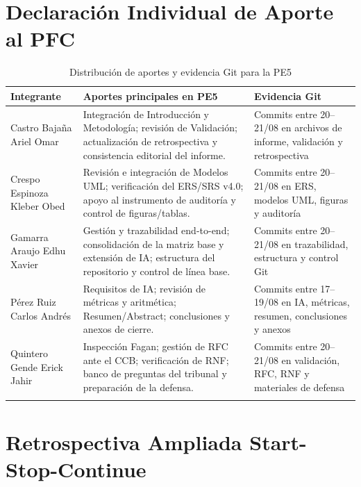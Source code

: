 \documentclass[11pt,a4paper]{article}
\begin{document}
\section{Declaración Individual de Aporte al PFC}
\label{anx:aporte}

\begin{longtable}{|p{3.7cm}|p{7cm}|p{3.2cm}|}
\hline
\textbf{Integrante} & \textbf{Aportes principales en PE5} & \textbf{Evidencia Git} \\
\hline
Castro Bajaña Ariel Omar &
Integración de Introducción y Metodología; revisión de Validación; actualización de retrospectiva y consistencia editorial del informe. &
Commits entre 20--21/08 en archivos de informe, validación y retrospectiva \\
\hline
Crespo Espinoza Kleber Obed &
Revisión e integración de Modelos UML; verificación del ERS/SRS v4.0; apoyo al instrumento de auditoría y control de figuras/tablas. &
Commits entre 20--21/08 en ERS, modelos UML, figuras y auditoría \\
\hline
Gamarra Araujo Edhu Xavier &
Gestión y trazabilidad end-to-end; consolidación de la matriz base y extensión de IA; estructura del repositorio y control de línea base. &
Commits entre 20--21/08 en trazabilidad, estructura y control Git \\
\hline
Pérez Ruiz Carlos Andrés &
Requisitos de IA; revisión de métricas y aritmética; Resumen/Abstract; conclusiones y anexos de cierre. &
Commits entre 17--19/08 en IA, métricas, resumen, conclusiones y anexos \\
\hline
Quintero Gende Erick Jahir &
Inspección Fagan; gestión de RFC ante el CCB; verificación de RNF; banco de preguntas del tribunal y preparación de la defensa. &
Commits entre 20--21/08 en validación, RFC, RNF y materiales de defensa \\
\hline
\caption{Distribución de aportes y evidencia Git para la PE5}
\label{tab:aporte_individual}
\end{longtable}

\section{Retrospectiva Ampliada Start-Stop-Continue}
\label{anx:retro}
\end{document}
